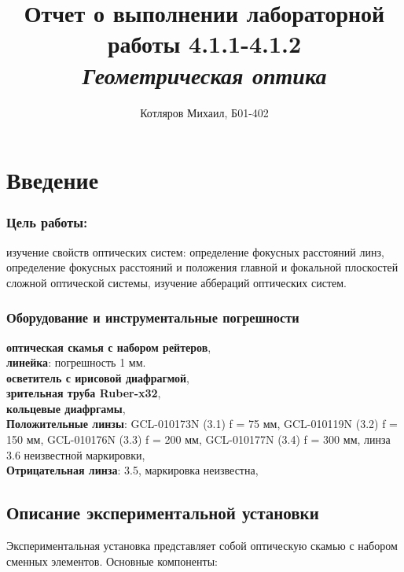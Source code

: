 \documentclass[a4paper]{article}
\title{\textbf{Отчет о выполнении лабораторной работы 4.1.1-4.1.2} \\[0.5em] \large\itshape Геометрическая оптика}
\date{}
\author{Котляров Михаил, Б01-402}
\begin{document}
\maketitle
	
\section{Введение}

\subsubsection*{Цель работы:} изучение свойств оптических систем: определение фокусных расстояний линз, определение фокусных расстояний и положения главной и фокальной плоскостей сложной оптической системы, изучение аббераций оптических систем.


\subsubsection*{Оборудование и инструментальные погрешности}

\textbf{оптическая скамья с набором рейтеров},\\
\textbf{линейка}: погрешность 1 мм.\\
\textbf{осветитель с ирисовой диафрагмой},\\
\textbf{зрительная труба Ruber-x32},\\
\textbf{кольцевые диафргамы},\\
\textbf{Положительные линзы}: GCL-010173N (3.1) f = 75 мм, GCL-010119N (3.2) f = 150 мм, GCL-010176N (3.3) f = 200 мм, GCL-010177N (3.4) f = 300 мм, линза 3.6 неизвестной маркировки,\\
\textbf{Отрицательная линза}: 3.5, маркировка неизвестна,


\subsection*{Описание экспериментальной установки}

Экспериментальная установка представляет собой оптическую скамью с набором сменных элементов. Основные компоненты:
\end{document}
